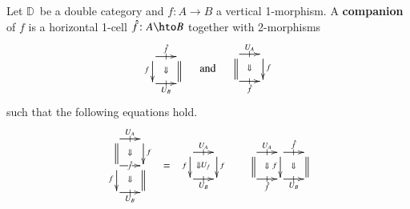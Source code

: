 \documentclass[oneside]{amsart}
\newcommand{\lD}{\ensuremath{\mathbb{D}}}
\newcommand{\fhat}{\ensuremath{\hat{f}}}
\let\maps\colon
\theoremstyle{definition}
\theoremstyle{remark}
\numberwithin{equation}{section}
\begin{document}
\begin{defn}\label{def:companion}
  Let \lD\ be a double category and $f\maps A\to B$ a vertical
  1-morphism.  A \textbf{companion} of $f$ is a horizontal 1-cell
  $\fhat\maps A\hto B$ together with 2-morphisms
  \begin{equation*}
    \begin{array}{c}
      \xymatrix@-.5pc{
        \ar[r]|-@{|}^-{\fhat} \ar[d]_f \ar@{}[dr]|\Downarrow
        & \ar@{=}[d]\\
        \ar[r]|-@{|}_-{U_B} & }
    \end{array}\quad\text{and}\quad
    \begin{array}{c}
      \xymatrix@-.5pc{
        \ar[r]|-@{|}^-{U_A} \ar@{=}[d] \ar@{}[dr]|\Downarrow
        & \ar[d]^f\\
        \ar[r]|-@{|}_-{\fhat} & }
    \end{array}
  \end{equation*}
  such that the following equations hold.
  \begin{align}\label{eq:compeqn}
    \begin{array}{c}
      \xymatrix@-.5pc{
        \ar[r]|-@{|}^-{U_A} \ar@{=}[d] \ar@{}[dr]|\Downarrow
        & \ar[d]^f\\
        \ar[r]|-{\fhat} \ar[d]_f \ar@{}[dr]|\Downarrow
        & \ar@{=}[d]\\
        \ar[r]|-@{|}_-{U_B} & }
    \end{array} &= 
    \begin{array}{c}
      \xymatrix@-.5pc{ \ar[r]|-@{|}^-{U_A} \ar[d]_f
        \ar@{}[dr]|{\Downarrow U_f} &  \ar[d]^f\\
        \ar[r]|-@{|}_-{U_B} & }
    \end{array}
    &
    \begin{array}{c}
      \xymatrix@-.5pc{
        \ar[r]|-@{|}^-{U_A} \ar@{=}[d] \ar@{}[dr]|\Downarrow &
        \ar[r]|-@{|}^-{\fhat} \ar[d]_f \ar@{}[dr]|\Downarrow
        & \ar@{=}[d]\\
        \ar[r]|-@{|}_-{\fhat} &
        \ar[r]|-@{|}_-{U_B} &}

\end{array}
\end{align}
\end{defn}
\end{document}
